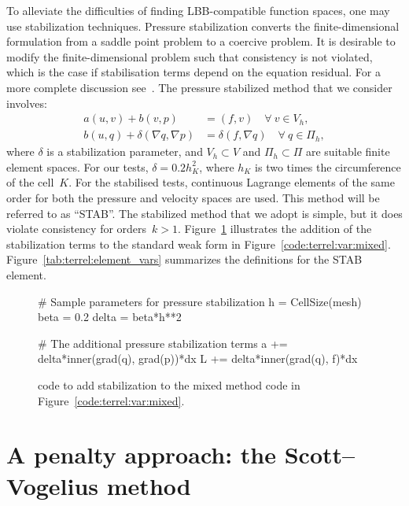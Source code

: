 To alleviate the difficulties of finding LBB-compatible function spaces,
one may use stabilization techniques.  Pressure stabilization converts the
finite-dimensional formulation from a saddle point problem to a coercive
problem. It is desirable to modify the finite-dimensional problem such
that consistency is not violated, which is the case if stabilisation
terms depend on the equation residual. For a more complete discussion
see~\citet{DoneaHuerta2003}.  The pressure stabilized method that we
consider involves:
%
\begin{align}
  a(u, v) + b(v, p)
      &=  (f, v) \quad \forall \ v \in V_{h},
\\
  b(u, q) + \delta (\nabla{q},\nabla{p}) &=  \delta (f, \nabla q)
\quad \forall \ q \in \Pi_{h},
\end{align}
%
where $\delta$ is a stabilization parameter, and $V_{h} \subset V$
and $\Pi_{h} \subset \Pi$ are suitable finite element spaces. For
our tests, $\delta = 0.2 h_{K}^{2}$, where $h_{K}$ is two times
the circumference of the cell~$K$.
For the stabilised tests,
continuous Lagrange elements of the same order for both the pressure
and velocity spaces are used. This method will be referred to
as ``STAB''. The stabilized method that we adopt is simple, but it
does violate consistency for orders~$k > 1$.
Figure~\ref{code:terrel:var:stab} illustrates the
addition of the stabilization terms to the standard weak form in
Figure~\ref{code:terrel:var:mixed}.  Figure~\ref{tab:terrel:element_vars}
summarizes the definitions for the STAB element.

\begin{figure}
\begin{python}
# Sample parameters for pressure stabilization
h = CellSize(mesh)
beta = 0.2
delta = beta*h**2

# The additional pressure stabilization terms
a += delta*inner(grad(q), grad(p))*dx
L += delta*inner(grad(q), f)*dx
\end{python}
\caption{\ufl{} code to add stabilization to the mixed method
code in Figure~\ref{code:terrel:var:mixed}.}
\label{code:terrel:var:stab}
\end{figure}
\section{A penalty approach: the Scott--Vogelius method}

